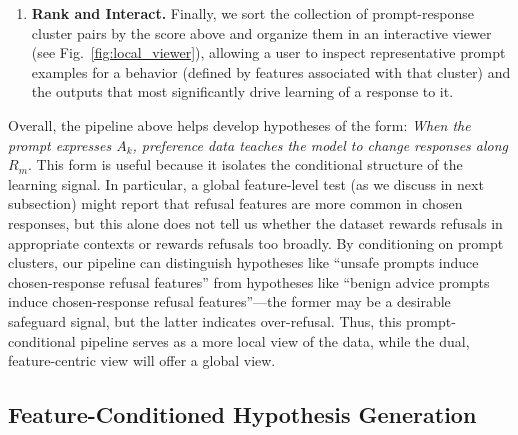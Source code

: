 \documentclass{article} %
\begin{document}
\begin{enumerate}[leftmargin=*]
    \item \textbf{Rank and Interact.} Finally, we sort the collection of prompt-response cluster pairs by the score above and organize them in an interactive viewer (see Fig.~\ref{fig:local_viewer}), allowing a user to inspect representative prompt examples for a behavior (defined by features associated with that cluster) and the outputs that most significantly drive learning of a response to it. 
\end{enumerate}




Overall, the pipeline above helps develop hypotheses of the form: \emph{When the prompt expresses $A_k$, preference data teaches the model to change responses along $R_m$}. 
% 
This form is useful because it isolates the conditional structure of the learning signal. 
% 
In particular, a global feature-level test (as we discuss in next subsection) might report that refusal features are more common in chosen responses, but this alone does not tell us whether the dataset rewards refusals in appropriate contexts or rewards refusals too broadly. 
% 
By conditioning on prompt clusters, our pipeline can distinguish hypotheses like ``unsafe prompts induce chosen-response refusal features'' from hypotheses like ``benign advice prompts induce chosen-response refusal features''---the former may be a desirable safeguard signal, but the latter indicates over-refusal. 
% 
Thus, this prompt-conditional pipeline serves as a more local view of the data, while the dual, feature-centric view will offer a global view.






\subsection{Feature-Conditioned Hypothesis Generation}
\label{sec:feature-conditioned-hypothesis-generation}
\end{document}
